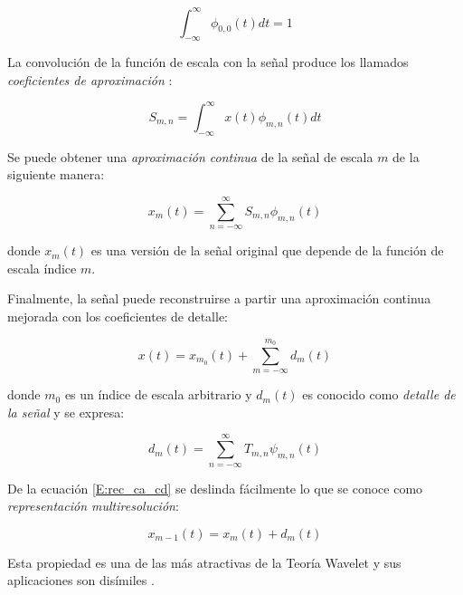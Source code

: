    \begin{equation}\label{E:p1sf}
    \int_{-\infty}^{\infty}	\phi_{0,0}(t) dt = 1
    \end{equation}
    
La convoluci\'on de la funci\'on de escala con la se\~nal produce los llamados \emph{coeficientes de aproximaci\'on} \cite{addison2017illustrated}:

 \begin{equation}\label{E:scala_conv}
     	S_{m,n} = \int_{-\infty}^{\infty}
     	x(t) \phi_{m,n}(t) dt
 \end{equation}


Se puede obtener una \emph{aproximaci\'on continua} de la se\~nal de escala $m$ de la siguiente manera:

 \begin{equation}\label{E:aproximaccion_continua_m}
 x_m(t) = \sum_{n=-\infty}^{\infty}
     	S_{m,n} \phi_{m,n}(t)
 \end{equation}
 
 donde $x_m(t)$ es una versi\'on de la se\~nal original que depende de la funci\'on de escala \'indice $m$.
 
 Finalmente, la se\~nal puede reconstruirse a partir una aproximaci\'on continua mejorada con los coeficientes de detalle:
 
 \begin{equation}\label{E:rec_ca_cd}
 x(t) = x_{m_0}(t) +
     	\sum_{m=-\infty}^{m_0} d_m(t)
 \end{equation} 
 
 
 donde $m_0$ es un \'indice de escala arbitrario y $d_m(t)$ es conocido como \emph{detalle de la se\~nal} y se expresa:
 
 \begin{equation}\label{E:signal_detail}
  d_m(t) = \sum_{n=-\infty}^{\infty}
   	T_{m,n}\psi_{m,n}(t)	
 \end{equation} 
 
 De la ecuaci\'on \ref{E:rec_ca_cd} se deslinda f\'acilmente lo que se conoce como \emph{representaci\'on multiresoluci\'on}:
 
 \begin{equation}\label{E:multiresolution_representation}
   x_{m-1}(t) = x_{m}(t) + d_m(t)
  \end{equation} 
  
  
  Esta propiedad es una de las m\'as atractivas de la Teor\'ia Wavelet y sus aplicaciones son dis\'imiles \cite{barba2011reconocimiento, cano2010analisis}.
 

